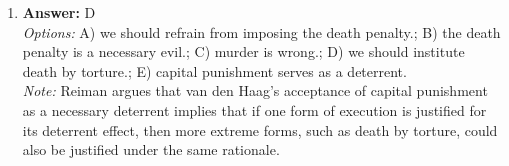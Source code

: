 \documentclass[12pt]{article}
\begin{document}
\begin{enumerate}[label=\arabic*.]
\\ \textit{Note:} Lukianoff and Haidt argue that institutionalizing vindictive protectiveness stifles intellectual growth and resilience by creating an environment where individuals are shielded from challenging ideas and experiences, ultimately hindering their ability to learn effectively.
\item \textbf{Answer:} D
\\ \textit{Options:} A) we should refrain from imposing the death penalty.; B) the death penalty is a necessary evil.; C) murder is wrong.; D) we should institute death by torture.; E) capital punishment serves as a deterrent.
\\ \textit{Note:} Reiman argues that van den Haag's acceptance of capital punishment as a necessary deterrent implies that if one form of execution is justified for its deterrent effect, then more extreme forms, such as death by torture, could also be justified under the same rationale.
\end{enumerate}
\end{document}
